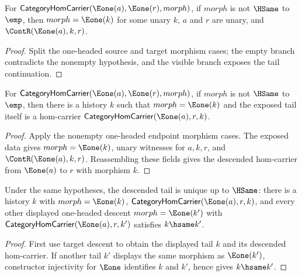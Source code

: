 \begin{theorem}\label{thm:category-e1-source-e1-target-nonempty-morphism-cases}
For $\mathsf{CategoryHomCarrier}(\Eone(a),\Eone(r),morph)$, if $morph$ is not $\HSame$ to $\emp$, then $morph=\Eone(k)$ for some unary $k$, $a$ and $r$ are unary, and $\ContR(\Eone(a),k,r)$.
\end{theorem}
\begin{proof} Split the one-headed source and target morphism cases; the empty branch contradicts the nonempty hypothesis, and the visible branch exposes the tail continuation.
\end{proof}

\begin{theorem}
\label{thm:category-hom-carrier-e1-source-e1-target-nonempty-morphism-target-descent}
For $\mathsf{CategoryHomCarrier}(\Eone(a),\Eone(r),morph)$, if $morph$ is
not $\HSame$ to $\emp$, then there is a history $k$ such that
$morph=\Eone(k)$ and the exposed tail itself is a hom-carrier
$\mathsf{CategoryHomCarrier}(\Eone(a),r,k)$.
\end{theorem}
\begin{proof}
Apply the nonempty one-headed endpoint morphism cases. The exposed data gives
$morph=\Eone(k)$, unary witnesses for $a,k,r$, and
$\ContR(\Eone(a),k,r)$. Reassembling these fields gives the descended
hom-carrier from $\Eone(a)$ to $r$ with morphism $k$.
\end{proof}

\begin{theorem}
\label{thm:category-hom-carrier-e1-source-e1-target-nonempty-morphism-descent-unique}
Under the same hypotheses, the descended tail is unique up to $\HSame$: there
is a history $k$ with $morph=\Eone(k)$,
$\mathsf{CategoryHomCarrier}(\Eone(a),r,k)$, and every other displayed
one-headed descent $morph=\Eone(k')$ with
$\mathsf{CategoryHomCarrier}(\Eone(a),r,k')$ satisfies $k\hsame k'$.
\end{theorem}
\begin{proof}
First use target descent to obtain the displayed tail $k$ and its descended
hom-carrier. If another tail $k'$ displays the same morphism as $\Eone(k')$,
constructor injectivity for $\Eone$ identifies $k$ and $k'$, hence gives
$k\hsame k'$.
\end{proof}


